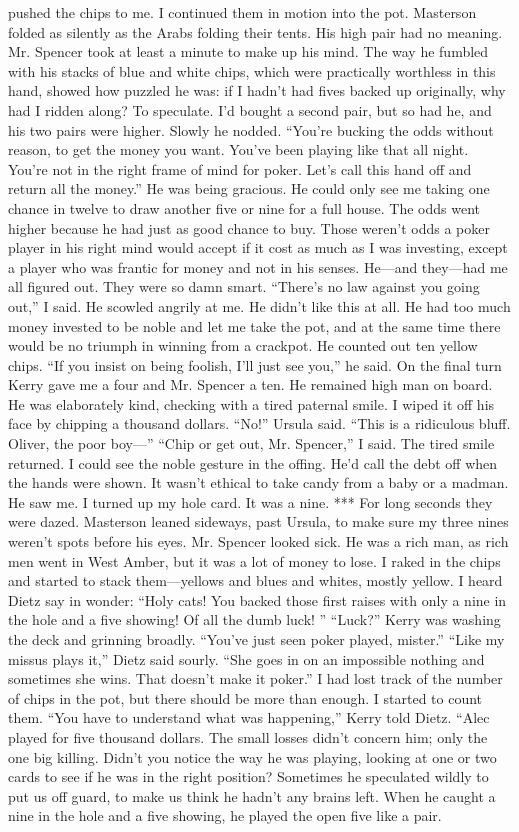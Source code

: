 \documentclass{novel}
\begin{document}
pushed the chips to me. I continued them in motion into the pot. Masterson folded as silently as the Arabs folding their tents. His high pair had no meaning. Mr. Spencer took at least a minute to make up his mind. The way he fumbled with his stacks of blue and white chips, which were practically worthless in this hand, showed how puzzled he was: if I hadn’t had fives backed up originally, why had I ridden along? To speculate. I’d bought a second pair, but so had he, and his two pairs were higher. Slowly he nodded. “You’re bucking the odds without reason, to get the money you want. You’ve been playing like that all night. You’re not in the right frame of mind for poker. Let’s call this hand off and return all the money.” He was being gracious. He could only see me taking one chance in twelve to draw another five or nine for a full house. The odds went higher because he had just as good chance to buy. Those weren’t odds a poker player in his right mind would accept if it cost as much as I was investing, except a player who was frantic for money and not in his senses. He—and they—had me all figured out. They were so damn smart. “There’s no law against you going out,” I said. He scowled angrily at me. He didn’t like this at all. He had too much money invested to be noble and let me take the pot, and at the same time there would be no triumph in winning from a crackpot. He counted out ten yellow chips. “If you insist on being foolish, I’ll just see you,” he said. On the final turn Kerry gave me a four and Mr. Spencer a ten. He remained high man on board. He was elaborately kind, checking with a tired paternal smile. I wiped it off his face by chipping a thousand dollars. “No!” Ursula said. “This is a ridiculous bluff. Oliver, the poor boy—” “Chip or get out, Mr. Spencer,” I said. The tired smile returned. I could see the noble gesture in the offing. He’d call the debt off when the hands were shown. It wasn’t ethical to take candy from a baby or a madman. He saw me. I turned up my hole card. It was a nine. *** For long seconds they were dazed. Masterson leaned sideways, past Ursula, to make sure my three nines weren’t spots before his eyes. Mr. Spencer looked sick. He was a rich man, as rich men went in West Amber, but it was a lot of money to lose. I raked in the chips and started to stack them—yellows and blues and whites, mostly yellow. I heard Dietz say in wonder: “Holy cats! You backed those first raises with only a nine in the hole and a five showing! Of all the dumb luck! ” “Luck?” Kerry was washing the deck and grinning broadly. “You’ve just seen poker played, mister.” “Like my missus plays it,” Dietz said sourly. “She goes in on an impossible nothing and sometimes she wins. That doesn’t make it poker.” I had lost track of the number of chips in the pot, but there should be more than enough. I started to count them. “You have to understand what was happening,” Kerry told Dietz. “Alec played for five thousand dollars. The small losses didn’t concern him; only the one big killing. Didn’t you notice the way he was playing, looking at one or two cards to see if he was in the right position? Sometimes he speculated wildly to put us off guard, to make us think he hadn’t any brains left. When he caught a nine in the hole and a five showing, he played the open five like a pair. 
\end{document}
